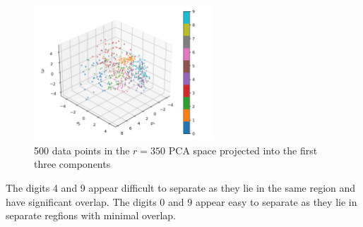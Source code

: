 \documentclass[11pt]{article}
\begin{document}
\subsection{}  %
\begin{figure}[H]
    \centering
    \includegraphics[width=0.6\textwidth]{1.4fig1.png}
    \caption{500 data points in the $r=350$ PCA space projected into the first three components}
    \label{fig_1.4_1}
\end{figure}
The digits 4 and 9 appear difficult to separate as they lie in the same region
and have significant overlap. The digits 0 and 9 appear easy to separate as they
lie in separate regfions with minimal overlap.

\section{}

\setcounter{subsection}{4}  %
\end{document}

